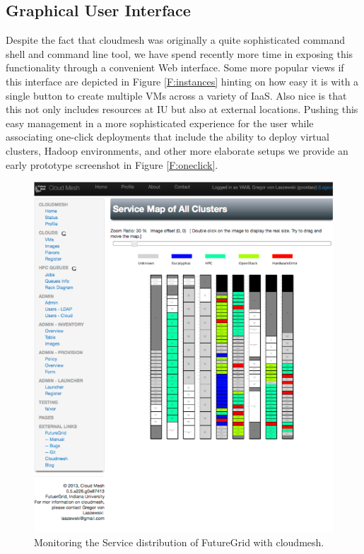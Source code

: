 \documentclass{article}
\begin{document}
{\subsection{Graphical User Interface}

Despite the fact that cloudmesh was originally a quite sophisticated command shell and command line tool, we have spend recently more time in exposing this functionality through a convenient Web interface. Some more popular views if this interface are depicted in Figure \ref{F:instances} hinting on how easy it is with a single button to create multiple VMs across a variety of IaaS. Also nice is that this not only includes resources at IU but also at external locations. Pushing this easy management in a more sophisticated experience for the user while associating one-click deployments that include the ability to deploy virtual clusters, Hadoop environments, and other more elaborate setups we provide an early prototype screenshot in Figure \ref{F:oneclick}.

\begin{figure}[htb]
  \centering
    \includegraphics[width=.7\textwidth]{images/rainbow.pdf}
  \caption{Monitoring the Service distribution of FutureGrid with cloudmesh.}
\end{figure}

}
\end{document}
